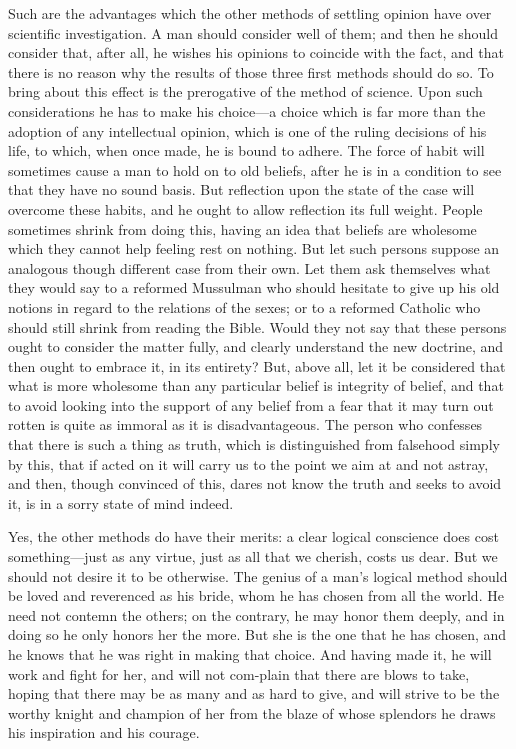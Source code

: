 Such are the advantages which the other methods of settling opinion
have over scientific investigation. A man should consider well of
them; and then he should consider that, after all, he wishes his
opinions to coincide with the fact, and that there is no reason why
the results of those three first methods should do so. To bring about
this effect is the prerogative of the method of science. Upon such
considerations he has to make his choice---a choice which is far more
than the adoption of any intellectual opinion, which is one of the
ruling decisions of his life, to which, when once made, he is bound to
adhere. The force of habit will sometimes cause a man to hold on to
old beliefs, after he is in a condition to see that they have no sound
basis. But reflection upon the state of the case will overcome these
habits, and he ought to allow reflection its full weight. People
sometimes shrink from doing this, having an idea that beliefs are
wholesome which they cannot help feeling rest on nothing. But let such
persons suppose an analogous though different case from their own. Let
them ask themselves what they would say to a reformed Mussulman who
should hesitate to give up his old notions in regard to the relations
of the sexes; or to a reformed Catholic who should still shrink from
reading the Bible. Would they not say that these persons ought to
consider the matter fully, and clearly understand the new doctrine,
and then ought to embrace it, in its entirety? But, above all, let it
be considered that what is more wholesome than any particular belief
is integrity of belief, and that to avoid looking into the support of
any belief from a fear that it may turn out rotten is quite as immoral
as it is disadvantageous. The person who confesses that there is such
a thing as truth, which is distinguished from falsehood simply by
this, that if acted on it will carry us to the point we aim at and not
astray, and then, though convinced of this, dares not know the truth
and seeks to avoid it, is in a sorry state of mind indeed.

Yes, the other methods do have their merits: a clear logical
conscience does cost some\-thing---just as any virtue, just as all
that we cherish, costs us dear. But we should not desire it to be
otherwise. The genius of a man's logical method should be loved and
reverenced as his bride, whom he has chosen from all the world. He
need not contemn the others; on the contrary, he may honor them
deeply, and in doing so he only honors her the more. But she is the
one that he has chosen, and he knows that he was right in making that
choice. And having made it, he will work and fight for her, and will
not com-plain that there are blows to take, hoping that there
may be as many and as hard to give, and will strive to be the worthy
knight and champion of her from the blaze of whose splendors he draws
his inspiration and his courage.

